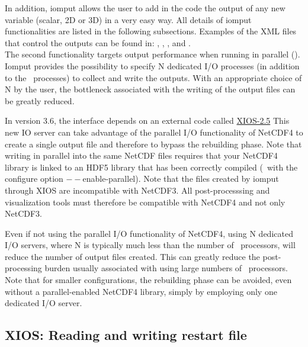 \documentclass[../main/NEMO_manual]{subfiles}
\begin{document}
In addition, iomput allows the user to add in the code the output of any new variable (scalar, 2D or 3D)
in a very easy way.
All details of iomput functionalities are listed in the following subsections.
Examples of the XML files that control the outputs can be found in:
,
,
,
 and . \\

The second functionality targets output performance when running in parallel ().
Iomput provides the possibility to specify N dedicated I/O processes (in addition to the \NEMO\ processes)
to collect and write the outputs.
With an appropriate choice of N by the user, the bottleneck associated with the writing of
the output files can be greatly reduced.

In version 3.6, the  interface depends on
an external code called \href{https://forge.ipsl.jussieu.fr/ioserver/browser/XIOS/branchs/xios-2.5}{XIOS-2.5}
This new IO server can take advantage of the parallel I/O functionality of NetCDF4 to
create a single output file and therefore to bypass the rebuilding phase.
Note that writing in parallel into the same NetCDF files requires that your NetCDF4 library is linked to
an HDF5 library that has been correctly compiled (\ie\ with the configure option $--$enable-parallel).
Note that the files created by iomput through XIOS are incompatible with NetCDF3.
All post-processsing and visualization tools must therefore be compatible with NetCDF4 and not only NetCDF3.

Even if not using the parallel I/O functionality of NetCDF4, using N dedicated I/O servers,
where N is typically much less than the number of \NEMO\ processors, will reduce the number of output files created.
This can greatly reduce the post-processing burden usually associated with using large numbers of \NEMO\ processors.
Note that for smaller configurations, the rebuilding phase can be avoided,
even without a parallel-enabled NetCDF4 library, simply by employing only one dedicated I/O server.

\subsection{XIOS: Reading and writing restart file}
\end{document}

